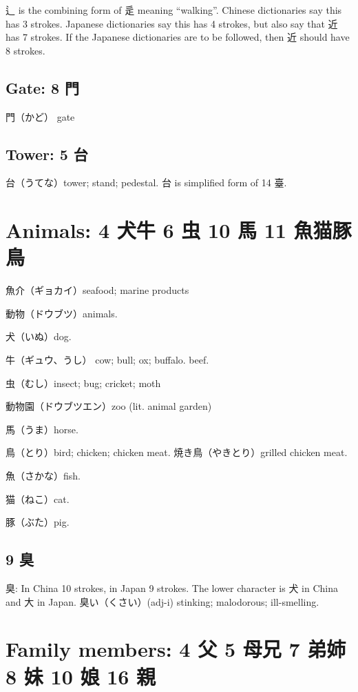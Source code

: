辶 is the combining form of 辵 meaning ``walking''.
Chinese dictionaries say this has 3 strokes.
Japanese dictionaries say this has 4 strokes,
but also say that 近 has 7 strokes.
If the Japanese dictionaries are to be followed,
then 近 should have 8 strokes.

\subsection{Gate: 8 門}

門（かど） gate

\subsection{Tower: 5 台}

台（うてな）tower; stand; pedestal.
台 is simplified form of 14 臺.

\section{Animals: 4 犬牛 6 虫 10 馬 11 魚猫豚鳥}

魚介（ギョカイ）seafood; marine products

動物（ドウブツ）animals.

犬（いぬ）dog.

牛（ギュウ、うし）
cow; bull; ox; buffalo.
beef.

虫（むし）insect; bug; cricket; moth

動物園（ドウブツエン）zoo (lit. animal garden)

馬（うま）horse.

鳥（とり）bird; chicken; chicken meat.
焼き鳥（やきとり）grilled chicken meat.

魚（さかな）fish.

猫（ねこ）cat.

豚（ぶた）pig.

\subsection{9 臭}

臭: In China 10 strokes, in Japan 9 strokes.
The lower character is 犬 in China and 大 in Japan.
臭い（くさい）(adj-i) stinking; malodorous; ill-smelling.

\section{Family members: 4 父 5 母兄 7 弟姉 8 妹 10 娘 16 親}

